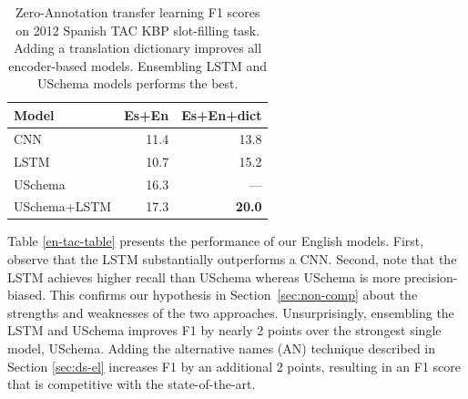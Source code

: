 \begin{table}[h!]

\begin{center}
\begin{tabular}{|lrr|}
\hline
\bf Model & \bf Es+En & \bf Es+En+dict  \\
\hline\hline
CNN 		                    & 11.4     & 13.8	\\
LSTM 	                        & 10.7     & 15.2   \\
USchema                         & 16.3     & --- \\
\hline
USchema+LSTM                    & 17.3     & \bf 20.0 \\
\hline
\end{tabular}
\caption{Zero-Annotation transfer learning F1 scores on 2012 Spanish TAC KBP slot-filling task. Adding a translation dictionary improves all encoder-based models. Ensembling LSTM and USchema models performs the best. \label{es-tac-table}}
\end{center}
\end{table}




Table \ref{en-tac-table} presents the performance of our English models. First, observe that the LSTM substantially outperforms a CNN. Second, note that the LSTM achieves higher recall than USchema whereas USchema is more precision-biased. This confirms our hypothesis in Section~\ref{sec:non-comp} about the strengths and weaknesses of the two approaches. 
Unsurprisingly, ensembling the LSTM and USchema improves F1 by nearly 2 points over the strongest single model, USchema. Adding the alternative names (AN) technique described in Section \ref{sec:ds-el} increases F1 by an additional 2 points, resulting in an F1 score that is competitive with the state-of-the-art.

